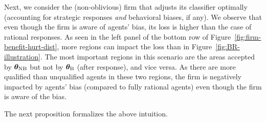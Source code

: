 \begin{example}
Next, we consider the (non-oblivious) firm that adjusts its classifier optimally (accounting for strategic responses \emph{and} behavioral biases, if any). We observe that even though the firm is aware of agents' bias, its loss is higher than the case of rational responses. As seen in the left panel of the bottom row of Figure~\ref{fig:firm-benefit-hurt-dist}, more regions can impact the loss than in Figure~\ref{fig:BR-illustration}. The most important regions in this scenario are the areas accepted by ${\bm{\theta}}_\text{NB}$ but not by ${\bm{\theta}}_\text{B}$ (after response), and vice versa. As there are more qualified than unqualified agents in these two regions, the firm is negatively impacted by agents' bias (compared to fully rational agents) even though the firm is aware of the bias.

\end{example}

The next proposition formalizes the above intuition. 

